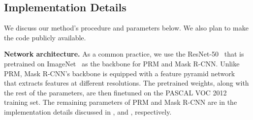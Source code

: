 \documentclass{bmvc2k}
\begin{document}
\begin{table}[t]
    \centering
    \vspace{3mm}
    \caption{\textbf{PASCAL VOC 2012.} Comparison of our framework (WISE) against other methods on various levels of supervision. WISE+Refine uses the refinement step shown in Figure~\ref{fig:inference}. Mask R-CNN and DeepMask use full supervision, whereas PRM uses image-level labels. Same as WISE, PRM and PRM+Density leverage a pretrained proposal method. Requiring stronger supervision than WISE, DeepMask and PRM+Density have access to bounding box and image-level counts, respectively.}
    \label{tab:pascal}
\end{table}


\subsection{Implementation Details}
We discuss our method's procedure and parameters below. We also plan to make the code publicly available.

{\bf Network architecture.} As a common practice, we use the ResNet-50~\cite{he2016deep} that is pretrained on ImageNet~\cite{deng2009imagenet} as the backbone for PRM and Mask R-CNN. Unlike PRM, Mask R-CNN's backbone is equipped with a feature pyramid network~\cite{Lin2016FPN} that extracts features at different resolutions. The pretrained weights, along with the rest of the parameters, are then finetuned on the PASCAL VOC 2012 training set. The remaining parameters of PRM and Mask R-CNN are in the implementation details discussed in \citet{Zhou2018PRM}, and \citet{he2017mask}, respectively.
\end{document}

